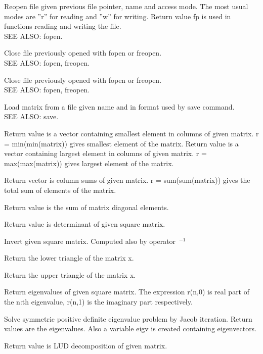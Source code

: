 Reopen file given previous file pointer, name and access mode. The most usual modes are ''r'' for reading and ''w'' for writing. Return value fp is used in functions reading and writing the file. \\
SEE ALSO: fopen. 

Close file previously opened with fopen or freopen. \\
SEE ALSO: fopen, freopen. 

Close file previously opened with fopen or freopen. \\
SEE ALSO: fopen, freopen. 

Load matrix from a file given name and in format used by save command. \\
SEE ALSO: save. 

Return value is a vector containing smallest element in columns of given matrix. r = min(min(matrix)) gives smallest element of the matrix. 
Return value is a vector containing largest element in columns of given matrix. r = max(max(matrix)) gives largest element of the matrix. 

Return vector is column sums of given matrix. r = sum(sum(matrix)) gives the total sum of elements of the matrix.

Return value is the sum of matrix diagonal elements. 

Return value is determinant of given square matrix. 

Invert given square matrix. Computed also by operator~$^{-1}$

Return the lower triangle of the matrix x. 

Return the upper triangle of the matrix x. 

Return eigenvalues of given square matrix. The expression r(n,0) is real part of the n:th eigenvalue, r(n,1) is the imaginary part respectively. 

Solve symmetric positive definite eigenvalue problem by Jacob iteration. Return values are the eigenvalues. Also a variable eigv is created containing eigenvectors. 

Return value is LUD decomposition of given matrix. 

